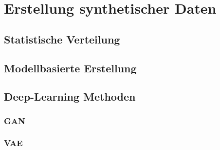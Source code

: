 \documentclass[../main.tex]{subfiles}
\begin{document}
\chapter{Erstellung synthetischer Daten}
\section{Statistische Verteilung}
\section{Modellbasierte Erstellung}
\section{Deep-Learning Methoden}
\subsection{GAN}
\subsection{VAE}
\end{document}
